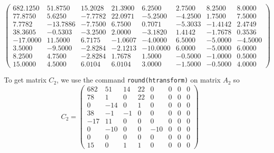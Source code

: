 \documentclass[12pt]{article}
\begin{document}
$$\begin{pmatrix}
682.1250 &  51.8750 &  15.2028 &  21.3900&    6.2500 &   2.7500 &   8.2500 &   8.0000\\
   77.8750   & 5.6250 &  -7.7782 &  22.0971 &  -5.2500  & -4.2500 &   1.7500 &   7.5000\\
    7.7782 & -13.7886 &  -7.7500  &  6.7500 &   0.7071 &  -5.3033 &  -1.4142 &   2.4749\\
  38.3605 &  -0.5303 &  -3.2500 &   2.0000   &-3.1820   & 1.4142  & -1.7678 &   0.3536\\
  -17.0000 &  11.5000 &   6.7175 &  -1.0607&   -4.0000  &  6.5000  & -5.0000 &  -4.5000\\
    3.5000&   -9.5000  & -2.8284 &  -2.1213&  -10.0000 &   6.0000&   -5.0000&    6.0000\\
    8.2500   & 4.7500 &  -2.8284  &  1.7678    &1.5000  & -0.5000 &  -1.0000   & 0.5000\\
   15.0000 &   4.5000 &   6.0104 &   6.0104    &3.0000  & -1.5000 &  -0.5000  &  4.0000
   \end{pmatrix}$$
   
To get matrix $C_2$, we use the command {\tt round(htransform)} on matrix $A_2$ so $$C_2 = \begin{pmatrix}
682 &   51  &   14   &  22  &    0  &    0 &     0 &     0\\
    78  &    1   &   0  &   22   &   0  &    0 &     0  &    0\\
     0  &  -14    &  0  &    1 &     0 &     0  &    0  &    0\\
    38  &   -1  &   -1 &     0  &    0  &    0  &    0  &    0\\
   -17  &   11  &    0   &   0  &    0   &   0  &    0  &    0\\
     0  &  -10  &    0  &    0 &   -10 &     0   &   0  &    0\\
     0    &  0  &    0   &   0  &    0  &    0 &     0 &     0\\
    15    &  0  &    1  &    1  &    0  &    0  &    0  &    0
\end{pmatrix}$$
\end{document}
